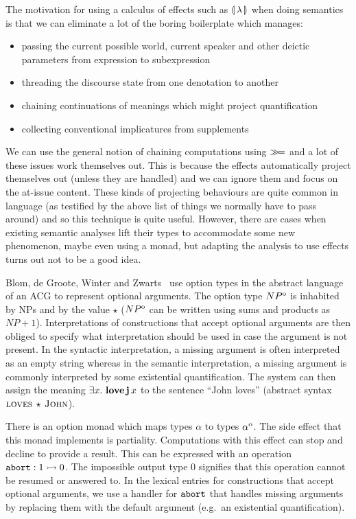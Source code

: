 The motivation for using a calculus of effects such as $\llparenthesis \, \lambda \, \rrparenthesis$
when doing semantics is that we can eliminate a lot of the boring
boilerplate which manages:

\begin{itemize}
\item passing the current possible world, current speaker and other deictic
  parameters from expression to subexpression
\item threading the discourse state from one denotation to another
\item chaining continuations of meanings which might project quantification
\item collecting conventional implicatures from supplements
\end{itemize}

We can use the general notion of chaining computations using $\mathbin{\gg\!=}$ and
a lot of these issues work themselves out. This is because the effects
automatically project themselves out (unless they are handled) and we can
ignore them and focus on the at-issue content. These kinds of projecting
behaviours are quite common in language (as testified by the above list of
things we normally have to pass around) and so this technique is quite
useful. However, there are cases when existing semantic analyses lift their
types to accommodate some new phenomenon, maybe even using a monad, but
adapting the analysis to use effects turns out not to be a good idea.

Blom, de Groote, Winter and Zwarts~\cite{blom2012implicit} use option types
in the abstract language of an ACG to represent optional arguments. The
option type $NP^{\mathrm{o}}$ is inhabited by NPs and by the value $\star$
($NP^{\mathrm{o}}$ can be written using sums and products as $NP +
1$). Interpretations of constructions that accept optional arguments are
then obliged to specify what interpretation should be used in case the
argument is not present. In the syntactic interpretation, a missing
argument is often interpreted as an empty string whereas in the semantic
interpretation, a missing argument is commonly interpreted by some
existential quantification. The system can then assign the meaning
$\exists x.\ \textbf{love}\,\textbf{j}\,x$ to the sentence ``John loves''
(abstract syntax $\textsc{loves}\,\star\,\textsc{John}$).

There is an option monad which maps types $\alpha$ to types
$\alpha^{\mathrm{o}}$. The side effect that this monad implements is
partiality. Computations with this effect can stop and decline to provide a
result. This can be expressed with an operation
$\mathtt{abort} : 1 \rightarrowtail 0$. The impossible output type $0$ signifies that this
operation cannot be resumed or answered to. In the lexical entries for
constructions that accept optional arguments, we use a handler for
$\mathtt{abort}$ that handles missing arguments by replacing them with the
default argument (e.g.\ an existential quantification).

